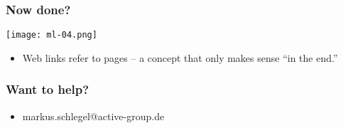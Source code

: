 \documentclass[aspectratio=169]{beamer}
\begin{document}
\begin{frame}
\frametitle{Now done?}
\texttt{[image: ml-04.png]}
\begin{itemize}
  \item Web links refer to pages -- a concept that only makes sense ``in the end.''
\end{itemize}
\end{frame}

\begin{frame}
\frametitle{Want to help?}
\begin{itemize}
  \item markus.schlegel@active-group.de
\end{itemize}
\end{frame}
\end{document}
